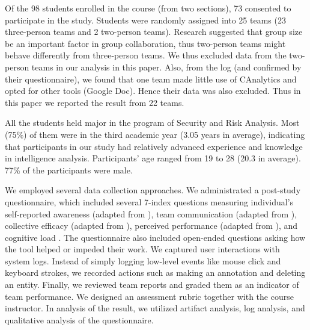 Of the 98 students enrolled in the course (from two sections), 73
consented to participate in the study. Students were randomly assigned
into 25 teams (23 three-person teams and 2 two-person teams). Research
suggested that group size be an important factor in group collaboration,
thus two-person teams might behave differently from three-person teams.
We thus excluded data from the two-person teams in our analysis in this
paper. Also, from the log (and confirmed by their questionnaire), we
found that one team made little use of CAnalytics and opted for other
tools (Google Doc). Hence their data was also excluded. Thus in this
paper we reported the result from 22 teams.

All the students held major in the program of Security and Risk
Analysis. Most (75\%) of them were in the third academic year (3.05
years in average), indicating that participants in our study had
relatively advanced experience and knowledge in intelligence analysis.
Participants' age ranged from 19 to 28 (20.3 in average). 77\% of the
participants were male.

We employed several data collection approaches. We administrated a
post-study questionnaire, which included several 7-index questions
measuring individual's self-reported awareness (adapted from
\autocite{Convertino2011}), team communication (adapted from
\autocite{Convertino2011}), collective efficacy (adapted from
\autocite{Convertino2011}), perceived performance (adapted from
\autocite{Goyal2014}), and cognitive load \autocite{Hart1988}. The
questionnaire also included open-ended questions asking how the tool
helped or impeded their work. We captured user interactions with system
logs. Instead of simply logging low-level events like mouse click and
keyboard strokes, we recorded actions such as making an annotation and
deleting an entity. Finally, we reviewed team reports and graded them as
an indicator of team performance. We designed an assessment rubric
together with the course instructor. In analysis of the result, we
utilized artifact analysis, log analysis, and qualitative analysis of
the questionnaire.
